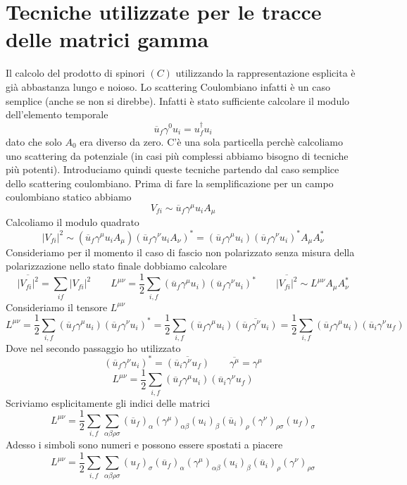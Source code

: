 \section{Tecniche utilizzate per le tracce delle matrici gamma}
Il calcolo del prodotto di spinori $(C)$ utilizzando la rappresentazione esplicita è già abbastanza lungo e noioso. Lo scattering Coulombiano infatti è un caso semplice (anche se non si direbbe). Infatti è stato sufficiente calcolare il modulo dell'elemento temporale
$$
\overline{u}_f \gamma^0 u_i = u_f^\dagger u_i
$$
dato che solo $A_0$ era diverso da zero. C'è una sola particella perchè calcoliamo uno scattering da potenziale (in casi più complessi abbiamo bisogno di tecniche più potenti). Introduciamo quindi queste tecniche partendo dal caso semplice dello scattering coulombiano. Prima di fare la semplificazione per un campo coulombiano statico abbiamo
$$
V_{fi} \sim \overline{u}_f \gamma^\mu u_i A_\mu
$$
Calcoliamo il modulo quadrato 
$$
|V_{fi}|^2 \sim (\overline{u}_f \gamma^\mu u_i A_\mu) (\overline{u}_f \gamma^\nu u_i A_\nu)^* = (\overline{u}_f \gamma^\mu u_i) (\overline{u}_f \gamma^\nu u_i)^* A_\mu A_\nu^*
$$
Consideriamo per il momento il caso di fascio non polarizzato senza misura della polarizzazione nello stato finale dobbiamo calcolare
$$
\overline{|V_{fi}|^2} = \sum_{if} |V_{fi}|^2 \qquad L^{\mu\nu} = \frac{1}{2} \sum_{i,f} (\overline{u}_f \gamma^\mu u_i) (\overline{u}_f \gamma^\nu u_i)^* \qquad \overline{|V_{fi}|^2} \sim L^{\mu\nu} A_\mu A_\nu^*
$$
Consideriamo il tensore $L^{\mu\nu}$
$$
L^{\mu\nu} = \frac{1}{2} \sum_{i,f} (\overline{u}_f \gamma^\mu u_i) (\overline{u}_f \gamma^\nu u_i)^* = \frac{1}{2} \sum_{i,f} (\overline{u}_f \gamma^\mu u_i) \overline{(\overline{u}_f \gamma^\nu u_i)} = \frac{1}{2} \sum_{i,f} (\overline{u}_f \gamma^\mu u_i) (\overline{u}_i \gamma^\nu u_f)
$$
Dove nel secondo passaggio ho utilizzato
$$
(\overline{u}_f \gamma^\nu u_i)^* = \overline{\left(\overline{u}_i \gamma^\nu u_f\right)} \qquad \overline{\gamma^\mu}=\gamma^\mu
$$
$$
L^{\mu\nu} = \frac{1}{2} \sum_{i,f} (\overline{u}_f \gamma^\mu u_i) (\overline{u}_i \gamma^\nu u_f)
$$
Scriviamo esplicitamente gli indici delle matrici
$$
L^{\mu\nu} = \frac{1}{2} \sum_{i,f} \sum_{\alpha\beta\rho\sigma} (\overline{u}_f)_\alpha (\gamma^\mu)_{\alpha\beta} (u_i)_\beta (\overline{u}_i)_\rho (\gamma^\nu)_{\rho\sigma} (u_f)_\sigma
$$
Adesso i simboli sono numeri e possono essere spostati a piacere
$$
L^{\mu\nu} = \frac{1}{2} \sum_{i,f} \sum_{\alpha\beta\rho\sigma} (u_f)_\sigma (\overline{u}_f)_\alpha (\gamma^\mu)_{\alpha\beta} (u_i)_\beta (\overline{u}_i)_\rho (\gamma^\nu)_{\rho\sigma} 
$$

